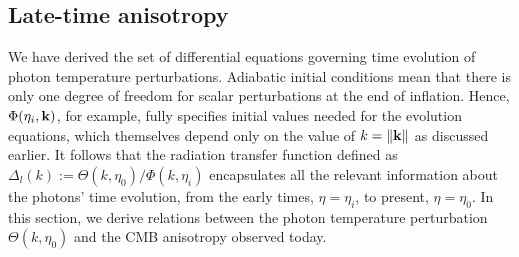 \iffalse
We note that it is the free-streaming of photons that causes adjacent $l$ multipoles of the temperature perturbations to mix. The first two equations of the Boltzmann hierarchy are 
\begin{align}
	\Theta'_0 + k\Theta_1 &= \Phi' \\
	\Theta'_1 - \frac{1}{3} k\Theta_0 +\frac{2}{3} k\Theta_2 &= \frac{1}{3} k \Psi + \tau'(\Theta_1 + \frac{1}{3} k v_b)
\end{align}

Note the energy-momentum tensor
\begin{align}
	T^{\mu\nu} = \int \frac{d^3 \vv{p}}{E(\vv{p})} f(\vv{p}) p^i p^j
\end{align}
in the rest frame. Note the integration measure is Lorentz invariant. Have $\delta_\gamma = 4\Theta_0$, $v_\gamma = (-3i/k) \Theta_1$, and $\Pi_\gamma = -3\Theta_2$.
\fi


\subsection{Late-time anisotropy}

We have derived the set of differential equations governing time evolution of photon temperature perturbations. Adiabatic initial conditions mean that there is only one degree of freedom for scalar perturbations at the end of inflation. Hence, $\Phi(\eta_i,\mathbf{k})$, for example, fully specifies initial values needed for the evolution equations, which themselves depend only on the value of $k=\|\mathbf{k}\|$ as discussed earlier. It follows that the radiation transfer function defined as $\Delta_l(k) := \Theta(k,\eta_0) / \Phi(k,\eta_i) $ encapsulates all the relevant information about the photons' time evolution, from the early times, $\eta=\eta_i$, to present, $\eta=\eta_0$. In this section, we derive relations between the photon temperature perturbation $\Theta(k,\eta_0)$ and the CMB anisotropy observed today.


